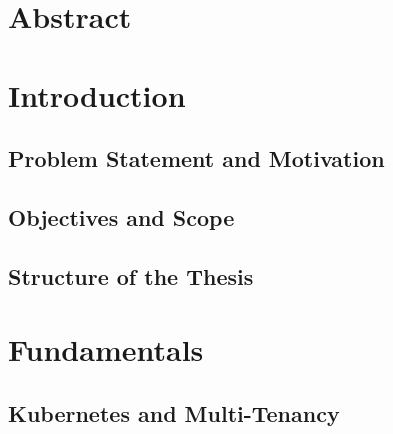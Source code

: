 \documentclass[11pt, a4paper, oneside, listof=totoc]{scrartcl}
\begin{document}
    \section*{Abstract}\label{abstract}

    \newpage

    \printglossary[type=\acronymtype, title={Acronyms}]
    \cleardoublepage
    \printglossary[title={Glossary}]


    \cleardoublepage

    \begingroup
        \tableofcontents
    \endgroup

    \newpage

    \cleardoublepage
    \begingroup
        \renewcommand{\addcontentsline}[3]{}
        \listoffigures
    \endgroup

    \cleardoublepage
    \begingroup
        \renewcommand{\addcontentsline}[3]{}
        \listoftables
    \endgroup

    \newpage


    \section{Introduction}\label{sec:introduction}

        \subsection{Problem Statement and Motivation}\label{subsec:problem}

        \subsection{Objectives and Scope}\label{subsec:objectives}

        \subsection{Structure of the Thesis}\label{subsec:structure}

    \section{Fundamentals}

        \subsection{Kubernetes and Multi-Tenancy}\label{subsec:k8sAndMultiTenancy}
\end{document}
